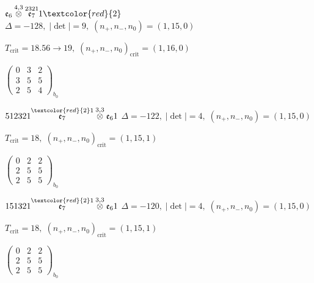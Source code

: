 \documentclass[10pt]{article}
\begin{document}
\smallskip

$\mathfrak{e}_6\overset{4,3}{\otimes}\overset{2321}{\mathfrak{e}_7}1\textcolor{red}{2}$ \quad $\Delta=-128,\; |\det|=9,\; (n_+,n_-,n_0)=(1,15,0)$

\hspace{1em}$T_{\text{crit}}=18.56 \to 19,\; (n_+,n_-,n_0)_{\text{crit}}=(1,16,0)$

\hspace{2em}$\left(\begin{smallmatrix}0 & 3 & 2 \\ 3 & 5 & 5 \\ 2 & 5 & 4\end{smallmatrix}\right)_{\!b_0}$

\smallskip

$512321\overset{\textcolor{red}{2}1}{\mathfrak{e}_7}\overset{3,3}{\otimes}\mathfrak{e}_61$ \quad $\Delta=-122,\; |\det|=4,\; (n_+,n_-,n_0)=(1,15,0)$

\hspace{1em}$T_{\text{crit}}=18,\; (n_+,n_-,n_0)_{\text{crit}}=(1,15,1)$

\hspace{2em}$\left(\begin{smallmatrix}0 & 2 & 2 \\ 2 & 5 & 5 \\ 2 & 5 & 5\end{smallmatrix}\right)_{\!b_0}$

\smallskip

$151321\overset{\textcolor{red}{2}1}{\mathfrak{e}_7}\overset{3,3}{\otimes}\mathfrak{e}_61$ \quad $\Delta=-120,\; |\det|=4,\; (n_+,n_-,n_0)=(1,15,0)$

\hspace{1em}$T_{\text{crit}}=18,\; (n_+,n_-,n_0)_{\text{crit}}=(1,15,1)$

\hspace{2em}$\left(\begin{smallmatrix}0 & 2 & 2 \\ 2 & 5 & 5 \\ 2 & 5 & 5\end{smallmatrix}\right)_{\!b_0}$

\smallskip
\end{document}
